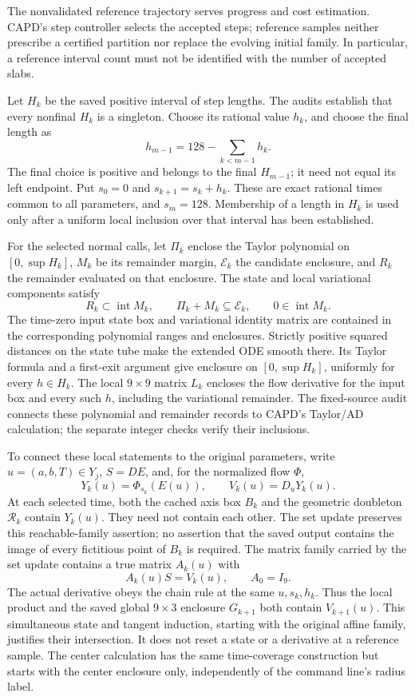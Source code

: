 \documentclass[10pt,a4paper]{article}
\theoremstyle{remark}
\begin{document}
The nonvalidated reference trajectory serves progress and cost
estimation. CAPD's step controller selects the accepted steps; reference
samples neither prescribe a certified partition nor replace the evolving
initial family. In particular, a reference interval count must not be
identified with the number of accepted slabs.

Let $H_k$ be the saved positive interval of step lengths. The audits
establish that every nonfinal $H_k$ is a singleton. Choose its rational
value $h_k$, and choose the final length as
\[
 h_{m-1}=128-\sum_{k<m-1}h_k.
\]
The final choice is positive and belongs to the final $H_{m-1}$; it need
not equal its left endpoint. Put $s_0=0$ and $s_{k+1}=s_k+h_k$.
These are exact rational times common to all parameters, and $s_m=128$.
Membership of a length in $H_k$ is used only after a uniform local
inclusion over that interval has been established.

For the selected normal calls, let $\Pi_k$ enclose the Taylor polynomial
on $[0,\sup H_k]$, $M_k$ be its remainder margin, $\mathcal E_k$ the
candidate enclosure, and $R_k$ the remainder evaluated on that enclosure.
The state and local variational components satisfy
\[
 R_k\subset\operatorname{int} M_k,\qquad
 \Pi_k+M_k\subseteq\mathcal E_k,\qquad
 0\in\operatorname{int}M_k.
\]
The time-zero input state box and variational identity matrix are
contained in the corresponding polynomial ranges and enclosures. Strictly
positive squared distances on the state tube make the extended ODE
smooth there. Its Taylor formula and a first-exit argument give enclosure
on $[0,\sup H_k]$, uniformly for every $h\in H_k$. The local $9\times9$
matrix $L_k$ encloses the flow derivative for the input box and every
such $h$, including the variational remainder. The fixed-source audit
connects these polynomial and remainder records to CAPD's Taylor/AD
calculation; the separate integer checks verify their inclusions.

To connect these local statements to the original parameters, write
$u=(a,b,T)\in Y_j$, $S=DE$, and, for the normalized flow $\Phi$,
\[
 Y_k(u)=\Phi_{s_k}(E(u)),\qquad V_k(u)=D_uY_k(u).
\]
At each selected time, both the cached axis box $B_k$ and the geometric
doubleton $\mathcal R_k$ contain $Y_k(u)$. They need not contain each
other. The set update preserves this reachable-family assertion; no
assertion that the saved output contains the image of every fictitious
point of $B_k$ is required. The matrix family carried by the set update
contains a true matrix $A_k(u)$ with
\[
 A_k(u)S=V_k(u),\qquad A_0=I_9.
\]
The actual derivative obeys the chain rule at the same $u,s_k,h_k$.
Thus the local product and the saved global $9\times3$ enclosure
$G_{k+1}$ both contain $V_{k+1}(u)$. This simultaneous state and tangent
induction, starting with the original affine family, justifies their
intersection. It does not reset a state or a derivative at a reference
sample. The center calculation has the same time-coverage construction
but starts with the center enclosure only, independently of the command
line's radius label.
\end{document}
